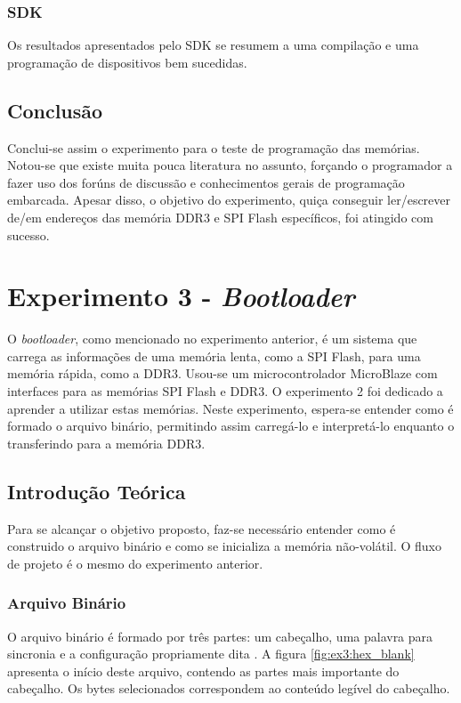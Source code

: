 \documentclass[11pt,a4paper,oneside]{book}
\begin{document}
\subsection{SDK}
Os resultados apresentados pelo SDK se resumem a uma compilação e uma programação de dispositivos bem sucedidas.

\section{Conclusão}
Conclui-se assim o experimento para o teste de programação das memórias.
Notou-se que existe muita pouca literatura no assunto, forçando o programador a fazer uso dos forúns de discussão e conhecimentos gerais de programação embarcada.
Apesar disso, o objetivo do experimento, quiça conseguir ler/escrever de/em endereços das memória DDR3 e SPI Flash específicos, foi atingido com sucesso.


\chapter{Experimento 3 - \textit{Bootloader}}
O \textit{bootloader}, como mencionado no experimento anterior, é um sistema que carrega as informações de uma memória lenta, como a SPI Flash, para uma memória rápida, como a DDR3.
Usou-se um microcontrolador MicroBlaze com interfaces para as memórias SPI Flash e DDR3.
O experimento 2 foi dedicado a aprender a utilizar estas memórias.
Neste experimento, espera-se entender como é formado o arquivo binário, permitindo assim carregá-lo e interpretá-lo enquanto o transferindo para a memória DDR3.

\section{Introdução Teórica}
Para se alcançar o objetivo proposto, faz-se necessário entender como é construido o arquivo binário e como se inicializa a memória não-volátil.
O fluxo de projeto é o mesmo do experimento anterior.


\subsection{Arquivo Binário}
\label{sec:binario}
O arquivo binário é formado por três partes: um cabeçalho, uma palavra para sincronia e a configuração propriamente dita \cite{ug470, xapp583}.
A figura \ref{fig:ex3:hex_blank} apresenta o início deste arquivo, contendo as partes mais importante do cabeçalho.
Os bytes selecionados correspondem ao conteúdo legível do cabeçalho.
\end{document}
